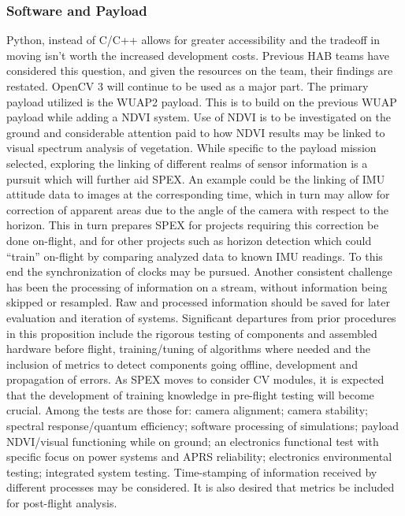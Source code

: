 \documentclass[conference]{IEEEtran} %
\begin{document}
\subsubsection{Software and Payload}
Python, instead of C/C++ allows for greater accessibility and the tradeoff in moving isn't worth the increased development costs. Previous HAB teams have considered this question, and given the resources on the team, their findings are restated. OpenCV 3 will continue to be used as a major part.
The primary payload utilized is the WUAP2 payload. This is to build on the previous WUAP payload while adding a NDVI system. Use of NDVI is to be investigated on the ground and considerable attention paid to how NDVI results may be linked to visual spectrum analysis of vegetation. While specific to the payload mission selected, exploring the linking of different realms of sensor information is a pursuit which will further aid SPEX. An example could be the linking of IMU attitude data to images at the corresponding time, which in turn may allow for correction of apparent areas due to the angle of the camera with respect to the horizon. This in turn prepares SPEX for projects requiring this correction be done on-flight, and for other projects such as horizon detection which could “train” on-flight by comparing analyzed data to known IMU readings. To this end the synchronization of clocks may be pursued. Another consistent challenge has been the processing of information on a stream, without information being skipped or resampled. Raw and processed information should be saved for later evaluation and iteration of systems.
Significant departures from prior procedures in this proposition include the rigorous testing of components and assembled hardware before flight, training/tuning of algorithms where needed and the inclusion of metrics to detect components going offline, development and propagation of errors. As SPEX moves to consider CV modules, it is expected that the development of training knowledge in pre-flight testing will become crucial. Among the tests are those for: camera alignment; camera stability; spectral response/quantum efficiency; software processing of simulations; payload NDVI/visual functioning while on ground; an electronics functional test with specific focus on power systems and APRS reliability; electronics environmental testing; integrated system testing.  Time-stamping of information received by different processes may be considered. It is also desired that metrics be included for post-flight analysis.
\end{document}
